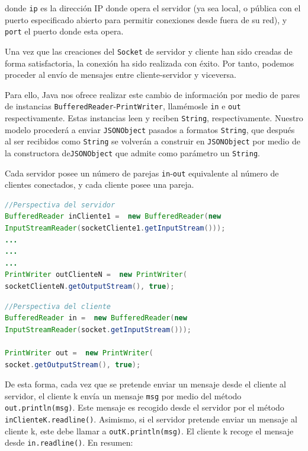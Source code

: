 \documentclass[../DocumentoOficial.tex]{subfiles}
\begin{document}
donde \texttt{ip} es la dirección IP donde opera el servidor (ya sea local, o pública con el puerto especificado abierto para permitir conexiones desde fuera de su red), y \texttt{port} el puerto donde esta opera.

Una vez que las creaciones del \texttt{Socket} de servidor y cliente han sido creadas de forma satisfactoria, la conexión ha sido realizada con éxito. Por tanto, podemos proceder al envío de mensajes entre cliente-servidor y viceversa.

Para ello, Java nos ofrece realizar este cambio de información por medio de pares de instancias \texttt{BufferedReader}-\texttt{PrintWriter}, llamémosle \texttt{in} e \texttt{out} respectivamente. Estas instancias leen y reciben \texttt{String}, respectivamente. Nuestro modelo procederá a enviar \texttt{JSONObject} pasados a formatos \texttt{String}, que después al ser recibidos como \texttt{String} se volverán a construir en \texttt{JSONObject} por medio de la constructora de\texttt{JSONObject} que admite como parámetro un \texttt{String}.

Cada servidor posee un número de parejas \texttt{in}-\texttt{out} equivalente al número de clientes conectados, y cada cliente posee una pareja.

\begin{lstlisting}[frame=single, language=Java]
//Perspectiva del servidor
BufferedReader inCliente1 =  new BufferedReader(new
InputStreamReader(socketCliente1.getInputStream()));
...
...
...
PrintWriter outClienteN =  new PrintWriter(
socketClienteN.getOutputStream(), true);
\end{lstlisting}

\begin{lstlisting}[frame=single, language=Java]
//Perspectiva del cliente
BufferedReader in =  new BufferedReader(new
InputStreamReader(socket.getInputStream()));

PrintWriter out =  new PrintWriter(
socket.getOutputStream(), true);
\end{lstlisting}


De esta forma, cada vez que se pretende enviar un mensaje desde el cliente al servidor, el cliente k envía un mensaje \texttt{msg} por medio del método \texttt{out.println(msg)}. Este mensaje es recogido desde el servidor por el método \texttt{inClienteK.readline()}. Asimismo, si el servidor pretende enviar un mensaje al cliente k, este debe llamar a \texttt{outK.println(msg)}. El cliente k recoge el mensaje desde \texttt{in.readline()}. En resumen:
\end{document}
